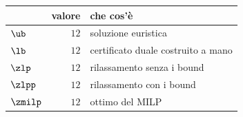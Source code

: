 \begin{center}\small
\begin{tabular}{lrl}
\toprule
 & valore & che cos'è \\
\midrule
$\ub$ & $12$ & soluzione euristica \\
$\lb$ & $12$ & certificato duale costruito a mano \\
$\zlp$ & $12$ & rilassamento senza i bound \\
$\zlpp$ & $12$ & rilassamento con i bound \\
$\zmilp$ & $12$ & ottimo del MILP \\
\bottomrule
\end{tabular}
\end{center}
